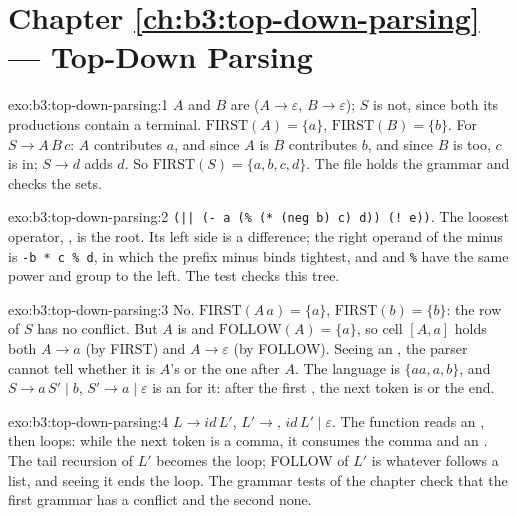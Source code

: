 \section*{Chapter \ref{ch:b3:top-down-parsing} --- Top-Down Parsing}

\begin{solution}{exo:b3:top-down-parsing:1}
$A$ and $B$ are  ($A \to \varepsilon$, $B \to \varepsilon$); $S$ is not, since both its productions contain a terminal. $\mathrm{FIRST}(A) = \{a\}$, $\mathrm{FIRST}(B) = \{b\}$. For $S \to A\,B\,c$: $A$ contributes $a$, and since $A$ is  $B$ contributes $b$, and since $B$ is  too, $c$ is in; $S \to d$ adds $d$. So $\mathrm{FIRST}(S) = \{a, b, c, d\}$. The file  holds the grammar and  checks the sets.
\end{solution}

\begin{solution}{exo:b3:top-down-parsing:2}
\texttt{(|| (- a (\% (* (neg b) c) d)) (! e))}. The loosest operator, \code{||}, is the root. Its left side is a difference; the right operand of the minus is \texttt{-b * c \% d}, in which the prefix minus binds tightest, and \code{*} and \texttt{\%} have the same power and group to the left. The test  checks this tree.
\end{solution}

\begin{solution}{exo:b3:top-down-parsing:3}
No. $\mathrm{FIRST}(A\,a) = \{a\}$, $\mathrm{FIRST}(b) = \{b\}$: the row of $S$ has no conflict. But $A$ is  and $\mathrm{FOLLOW}(A) = \{a\}$, so cell $[A, a]$ holds both $A \to a$ (by FIRST) and $A \to \varepsilon$ (by FOLLOW). Seeing an , the parser cannot tell whether it is $A$'s or the one after $A$. The language is $\{aa, a, b\}$, and $S \to a\,S' \mid b$, $S' \to a \mid \varepsilon$ is an  for it: after the first , the next token is  or the end.
\end{solution}

\begin{solution}{exo:b3:top-down-parsing:4}
$L \to \mathit{id}\,L'$, $L' \to ,\,\mathit{id}\,L' \mid \varepsilon$. The function reads an , then loops: while the next token is a comma, it consumes the comma and an . The tail recursion of $L'$ becomes the loop; FOLLOW of $L'$ is whatever follows a list, and seeing it ends the loop. The grammar tests of the chapter check that the first grammar has a conflict and the second none.
\end{solution}

